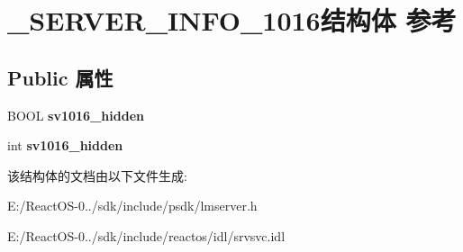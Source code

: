 \hypertarget{struct___s_e_r_v_e_r___i_n_f_o__1016}{}\section{\+\_\+\+S\+E\+R\+V\+E\+R\+\_\+\+I\+N\+F\+O\+\_\+1016结构体 参考}
\label{struct___s_e_r_v_e_r___i_n_f_o__1016}
\subsection*{Public 属性}
\begin{DoxyCompactItemize}
\item 
\mbox{\label{struct___s_e_r_v_e_r___i_n_f_o__1016_a677e7d294f75a1881c74fd71c1df9751}} 
B\+O\+OL {\bfseries sv1016\+\_\+hidden}
\item 
\mbox{\label{struct___s_e_r_v_e_r___i_n_f_o__1016_a04a9d039dbf370f49e4a52a1e8eca62f}} 
int {\bfseries sv1016\+\_\+hidden}
\end{DoxyCompactItemize}


该结构体的文档由以下文件生成\+:\begin{DoxyCompactItemize}
\item 
E\+:/\+React\+O\+S-\/0../sdk/include/psdk/lmserver.\+h\item 
E\+:/\+React\+O\+S-\/0../sdk/include/reactos/idl/srvsvc.\+idl\end{DoxyCompactItemize}
